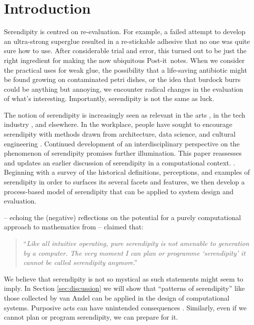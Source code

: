 \section{Introduction}

Serendipity is centred on re-evaluation.  For example, a failed
attempt to develop an ultra-strong superglue resulted in a
re-stickable adhesive that no one was quite sure how to use.  After
considerable trial and error, this turned out to be just the right
ingredient for making the now ubiquitous Post-it\texttrademark\ notes.
%
%
When we consider the practical uses for weak glue, the possibility
that a life-saving antibiotic might be found growing on contaminated
petri dishes, or the idea that burdock burrs could be anything but
annoying, we encounter radical changes in the evaluation of what's
interesting.  Importantly, serendipity is not the same as luck. 

The notion of serendipity is increasingly seen as relevant in the arts
\cite{mckay-serendipity}, in the tech industry \cite{rao2015breaking},
and elsewhere.  In the workplace, people have sought to encourage
serendipity with methods drawn from architecture, data science, and
cultural engineering
\cite{kakko2009homo,engineering-serendipity,who-moved-cube}.
Continued development of an interdisciplinary perspective on the
phenomenon of serendipity promises further illumination.  This paper
reassesses and updates an earlier discussion of serendipity in a
computational context.  \cite{pease2013discussion}.  Beginning with a
survey of the historical definitions, perceptions, and examples of
serendipity in order to surfaces its several facets and features, we
then develop a process-based model of serendipity that can
be applied to system design and evaluation.

 -- echoing the
(negative) reflections on the potential
for a purely computational approach to mathematics from  -- claimed that:
\begin{quote}
``\emph{Like all intuitive operating, pure serendipity is not amenable
    to generation by a computer.  The very moment I can plan or
    programme `serendipity' it cannot be called serendipity
    anymore}.'' \cite[p.~646]{van1994anatomy}
\end{quote}
We believe that serendipity is not so mystical as such statements
might seem to imply.  In Section \ref{sec:discussion} we will show
that ``patterns of serendipity'' like those collected by van Andel can
be applied in the design of computational systems.  Purposive acts can
have unintended consequences \cite{merton1936unanticipated}.
Similarly, even if we cannot plan or program serendipity, we can
prepare for it.

